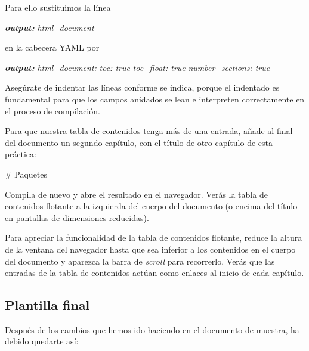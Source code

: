 \documentclass[
  title=normal,
  notoc,
  bib=normal]{mnye}
\newenvironment{Shaded}{\begin{snugshade}}{\end{snugshade}}
\newcommand{\AnnotationTok}[1]{\textcolor[rgb]{0.56,0.35,0.01}{\textbf{\textit{#1}}}}
\newcommand{\CommentTok}[1]{\textcolor[rgb]{0.56,0.35,0.01}{\textit{#1}}}
\newcommand{\FunctionTok}[1]{\textcolor[rgb]{0.00,0.00,0.00}{#1}}
\begin{document}
Para ello sustituimos la línea

\begin{Shaded}
\begin{Highlighting}[]
\AnnotationTok{output:}\CommentTok{ html\_document}
\end{Highlighting}
\end{Shaded}

en la cabecera YAML por

\begin{Shaded}
\begin{Highlighting}[]
\AnnotationTok{output:}\CommentTok{ }
\CommentTok{    html\_document:}
\CommentTok{        toc: true}
\CommentTok{        toc\_float: true}
\CommentTok{        number\_sections: true}
\end{Highlighting}
\end{Shaded}

Asegúrate de indentar las líneas conforme se indica, porque el indentado es fundamental para que los campos anidados se lean e interpreten correctamente en el proceso de compilación.

Para que nuestra tabla de contenidos tenga más de una entrada, añade al final del documento un segundo capítulo, con el título de otro capítulo de esta práctica:

\begin{Shaded}
\begin{Highlighting}[]
\FunctionTok{\# Paquetes}
\end{Highlighting}
\end{Shaded}

Compila de nuevo y abre el resultado en el navegador. Verás la tabla de contenidos flotante a la izquierda del cuerpo del documento (o encima del título en pantallas de dimensiones reducidas).

Para apreciar la funcionalidad de la tabla de contenidos flotante, reduce la altura de la ventana del navegador hasta que sea inferior a los contenidos en el cuerpo del documento y aparezca la barra de \emph{scroll} para recorrerlo. Verás que las entradas de la tabla de contenidos actúan como enlaces al inicio de cada capítulo.

\hypertarget{plantilla-final}{%
\subsection{Plantilla final}\label{plantilla-final}}

Después de los cambios que hemos ido haciendo en el documento de muestra, ha debido quedarte así:
\end{document}
